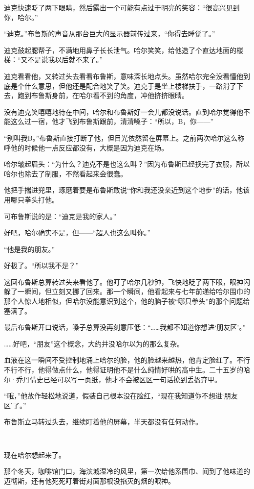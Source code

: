\documentclass[../main]{subfiles}
\begin{document}
迪克快速眨了两下眼睛，然后露出一个可能有点过于明亮的笑容：“很高兴见到你，哈尔。”

“迪克。”布鲁斯的声音从那台巨大的显示器前传过来，“你得去睡觉了。”

迪克鼓起腮帮子，不满地用鼻子长长泄气。哈尔笑笑，给他造了个直达地面的楼梯：“又不是说我以后就不来了。”

迪克看看他，又转过头去看看布鲁斯，意味深长地点头。虽然哈尔完全没看懂他到底是个什么意思，但他还是配合地笑了笑。迪克于是坐上楼梯扶手，一路滑了下去，跑到布鲁斯身前，在哈尔看不到的角度，冲他挤挤眼睛。

没有迪克笑嘻嘻地待在中间，哈尔和布鲁斯好一会儿都没说话。直到哈尔觉得他不能这么过一宿，他才飞到布鲁斯跟前，清清嗓子：“所以，B，你——”

“别叫我B。”布鲁斯直接打断了他，但目光依然留在屏幕上。之前两次哈尔这么称呼他的时候他一点反应都没有，大概是因为迪克在场。

哈尔皱起眉头：“为什么？迪克不是也这么叫？”因为布鲁斯已经换完了衣服，所以哈尔也除去了制服，不然看起来会很蠢。

他把手揣进兜里，琢磨着要是布鲁斯敢说“你和我还没亲近到这个地步”的话，他该用哪只拳头打他。

可布鲁斯说的是：“迪克是我的家人。”

好吧，哈尔确实不是，但——“超人也这么叫你。”

“他是我的朋友。”

好极了。“所以我不是？”

这回布鲁斯总算转过头来看他了。他盯了哈尔几秒钟，飞快地眨了两下眼，眼神闪躲了一瞬间，但立刻又挪了回来。那一个瞬间，他看起来与七年前递给哈尔围巾的那个人惊人地相似，但哈尔没能意识到这个，他的脑子被“哪只拳头”的那个问题给塞满了。

最后布鲁斯开口说话，嗓子总算没再刻意压低：“……我都不知道你想进‘朋友区’。”

……好吧，“朋友”这个概念，大约并没哈尔以为的那么复杂。

血液在这一瞬间不受控制地涌上哈尔的脸，他的脸越来越热，他肯定脸红了。不行不行不行，他得做点什么，他得证明他不是什么纯情好哄的高中生。二十五岁的哈尔·乔丹情史已经可以写一页纸，他才不会被区区一句话撩到丢盔弃甲。

“哦，”他故作轻松地说道，假装自己根本没在脸红，“现在我知道你不想进‘朋友区’了。”

布鲁斯立马转过头去，继续盯着他的屏幕，半天都没有任何动作。

~\

现在哈尔想起来了。

那个冬天，咖啡馆门口，海滨城湿冷的风里，第一次给他系围巾、闻到了他味道的迈彻斯，还有他死死盯着街对面那根没掐灭的烟的眼神。
\end{document}
